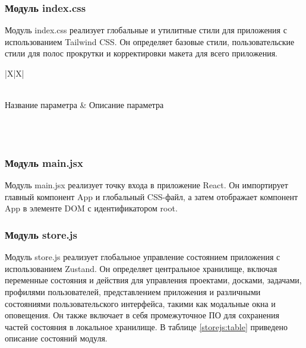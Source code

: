\subsubsection{Модуль index.css}
Модуль index.css реализует глобальные и утилитные стили для приложения с использованием Tailwind CSS. Он определяет базовые стили, пользовательские стили для полос прокрутки и корректировки макета для всего приложения.

\renewcommand{\arraystretch}{0.8}
\begin{xltabular}{\textwidth}{|X|X|}
	\caption{Описание параметров функций, используемых в index.css\label{indexcss:table}}\\
	\hline \centrow \setlength{\baselineskip}{0.7\baselineskip} Название параметра & \centrow \setlength{\baselineskip}{0.7\baselineskip} Описание параметра \\\hline
	\endfirsthead
	\caption*{Продолжение таблицы \ref{indexcss:table}}\\ \hline
	\finishhead
	 \\ \hline
\end{xltabular}

\subsubsection{Модуль main.jsx}
Модуль main.jsx реализует точку входа в приложение React. Он импортирует главный компонент App и глобальный CSS-файл, а затем отображает компонент App в элементе DOM с идентификатором root.

\subsubsection{Модуль store.js}
Модуль store.js реализует глобальное управление состоянием приложения с использованием Zustand. Он определяет центральное хранилище, включая переменные состояния и действия для управления проектами, досками, задачами, профилями пользователей, представлением приложения и различными состояниями пользовательского интерфейса, такими как модальные окна и оповещения. Он также включает в себя промежуточное ПО для сохранения частей состояния в локальное хранилище. В таблице \ref{storejs:table} приведено описание состояний модуля.

